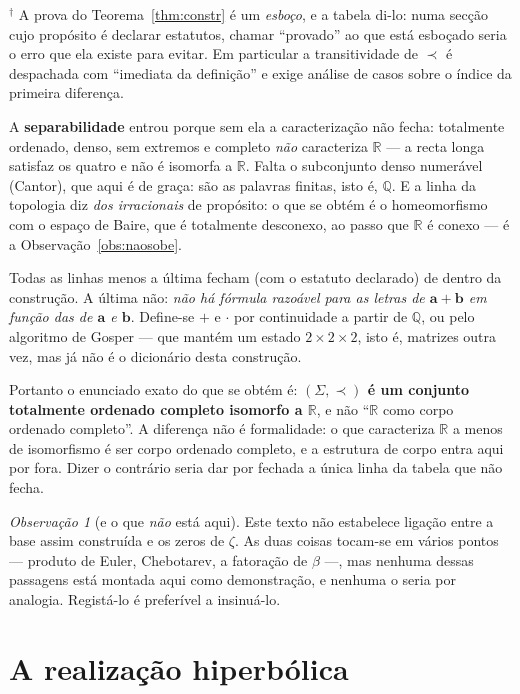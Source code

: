 \documentclass[11pt,a4paper]{article}
\theoremstyle{plain}
\theoremstyle{definition}
\theoremstyle{remark}
\newtheorem{obs}[teorema]{Observação}
\newcommand{\R}{\mathbb{R}}
\newcommand{\Q}{\mathbb{Q}}
\newcommand{\Sig}{\Sigma}
\begin{document}
\noindent $^\dagger$ A prova do Teorema~\ref{thm:constr} é um \emph{esboço}, e a tabela di-lo:
numa secção cujo propósito é declarar estatutos, chamar ``provado'' ao que está esboçado seria o
erro que ela existe para evitar. Em particular a transitividade de $\prec$ é despachada com
``imediata da definição'' e exige análise de casos sobre o índice da primeira diferença.

A \textbf{separabilidade} entrou porque sem ela a caracterização não fecha: totalmente ordenado,
denso, sem extremos e completo \emph{não} caracteriza $\R$ --- a recta longa satisfaz os quatro e
não é isomorfa a $\R$. Falta o subconjunto denso numerável (Cantor), que aqui é de graça: são as
palavras finitas, isto é, $\Q$. E a linha da topologia diz \emph{dos irracionais} de propósito: o
que se obtém é o homeomorfismo com o espaço de Baire, que é totalmente desconexo, ao passo que
$\R$ é conexo --- é a Observação~\ref{obs:naosobe}.

Todas as linhas menos a última fecham (com o estatuto declarado) de dentro da construção. A última
não: \emph{não há fórmula razoável para as letras de $\mathbf a + \mathbf b$ em função das de
$\mathbf a$ e $\mathbf b$}. Define-se $+$ e $\cdot$ por continuidade a partir de $\Q$, ou pelo
algoritmo de Gosper --- que mantém um estado $2\times2\times2$, isto é, matrizes outra vez, mas já
não é o dicionário desta construção.

Portanto o enunciado exato do que se obtém é: \textbf{$(\Sig,\prec)$ é um conjunto totalmente
ordenado completo isomorfo a $\R$}, e não ``$\R$ como corpo ordenado completo''. A diferença não é
formalidade: o que caracteriza $\R$ a menos de isomorfismo é ser corpo ordenado completo, e a
estrutura de corpo entra aqui por fora. Dizer o contrário seria dar por fechada a única linha da
tabela que não fecha.

\begin{obs}[e o que \emph{não} está aqui]
Este texto não estabelece ligação entre a base assim construída e os zeros de $\zeta$. As duas
coisas tocam-se em vários pontos --- produto de Euler, Chebotarev, a fatoração de $\beta$ ---, mas
nenhuma dessas passagens está montada aqui como demonstração, e nenhuma o seria por analogia.
Registá-lo é preferível a insinuá-lo.
\end{obs}


\section{A realização hiperbólica}
\end{document}
